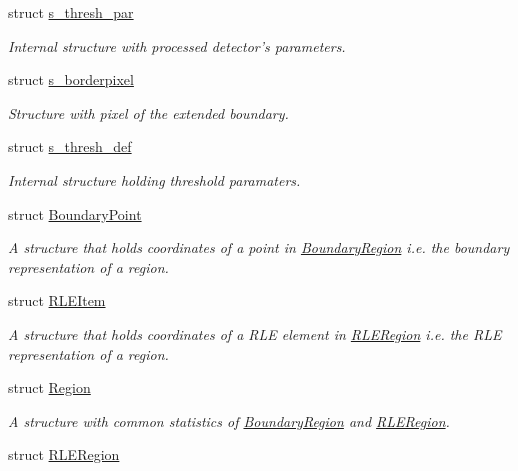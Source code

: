 \begin{CompactItemize}
struct \hyperlink{structextrema_1_1s__thresh__par}{s\_\-thresh\_\-par}
\begin{CompactList}\small\item\em Internal structure with processed detector's parameters. \item\end{CompactList}\item 
struct \hyperlink{structextrema_1_1s__borderpixel}{s\_\-borderpixel}
\begin{CompactList}\small\item\em Structure with pixel of the extended boundary. \item\end{CompactList}\item 
struct \hyperlink{structextrema_1_1s__thresh__def}{s\_\-thresh\_\-def}
\begin{CompactList}\small\item\em Internal structure holding threshold paramaters. \item\end{CompactList}\item 
struct \hyperlink{structextrema_1_1BoundaryPoint}{Boundary\-Point}
\begin{CompactList}\small\item\em A structure that holds coordinates of a point in \hyperlink{structextrema_1_1BoundaryRegion}{Boundary\-Region} i.e. the boundary representation of a region. \item\end{CompactList}\item 
struct \hyperlink{structextrema_1_1RLEItem}{RLEItem}
\begin{CompactList}\small\item\em A structure that holds coordinates of a RLE element in \hyperlink{structextrema_1_1RLERegion}{RLERegion} i.e. the RLE representation of a region. \item\end{CompactList}\item 
struct \hyperlink{structextrema_1_1Region}{Region}
\begin{CompactList}\small\item\em A structure with common statistics of \hyperlink{structextrema_1_1BoundaryRegion}{Boundary\-Region} and \hyperlink{structextrema_1_1RLERegion}{RLERegion}. \item\end{CompactList}\item 
struct \hyperlink{structextrema_1_1RLERegion}{RLERegion}

\end{CompactItemize}
